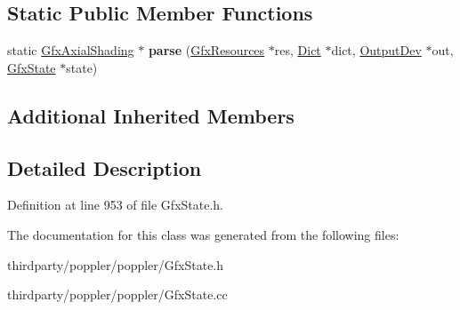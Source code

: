 \subsection*{Static Public Member Functions}
\begin{DoxyCompactItemize}
\item 
\mbox{\label{class_gfx_axial_shading_aa3832fe08489228cfb4d39801bc42e6e}} 
static \hyperlink{class_gfx_axial_shading}{Gfx\+Axial\+Shading} $\ast$ {\bfseries parse} (\hyperlink{class_gfx_resources}{Gfx\+Resources} $\ast$res, \hyperlink{class_dict}{Dict} $\ast$dict, \hyperlink{class_output_dev}{Output\+Dev} $\ast$out, \hyperlink{class_gfx_state}{Gfx\+State} $\ast$state)
\end{DoxyCompactItemize}
\subsection*{Additional Inherited Members}


\subsection{Detailed Description}


Definition at line 953 of file Gfx\+State.\+h.



The documentation for this class was generated from the following files\+:\begin{DoxyCompactItemize}
\item 
thirdparty/poppler/poppler/Gfx\+State.\+h\item 
thirdparty/poppler/poppler/Gfx\+State.\+cc\end{DoxyCompactItemize}
